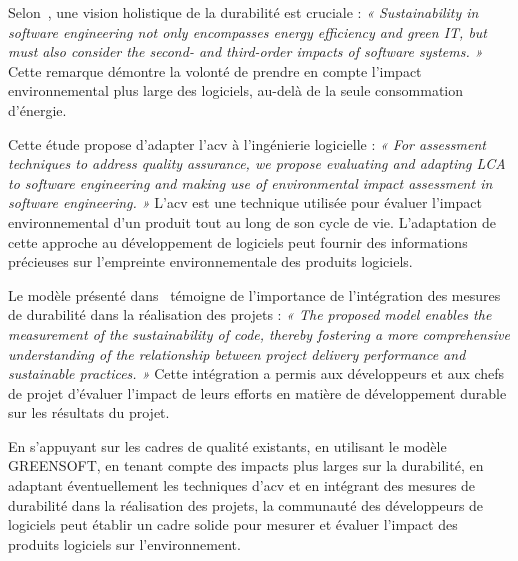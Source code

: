 Selon~\cite{SafetySecuritySustainability}, une vision holistique de la durabilité est cruciale : \emph{« Sustainability in software engineering not only encompasses energy efficiency and green IT, but must also consider the second- and third-order impacts of software systems. »} 
Cette remarque démontre la volonté de prendre en compte l'impact environnemental plus large des logiciels, au-delà de la seule consommation d'énergie.


Cette étude propose d'adapter l'\acrfull{acv} à l'ingénierie logicielle : \emph{« For assessment techniques to address quality assurance, we propose evaluating and adapting LCA to software engineering and making use of environmental impact assessment in software engineering. »} 
L'\acrshort{acv} est une technique utilisée pour évaluer l'impact environnemental d'un produit tout au long de son cycle de vie. 
L'adaptation de cette approche au développement de logiciels peut fournir des informations précieuses sur l'empreinte environnementale des produits logiciels.


Le modèle présenté dans~\cite{IntegrationSustainabilityMetrics} témoigne de l'importance de l'intégration des mesures de durabilité dans la réalisation des projets : \emph{« The proposed model enables the measurement of the sustainability of code, thereby fostering a more comprehensive understanding of the relationship between project delivery performance and sustainable practices. »} 
Cette intégration a permis aux développeurs et aux chefs de projet d'évaluer l'impact de leurs efforts en matière de développement durable sur les résultats du projet.


En s'appuyant sur les cadres de qualité existants, en utilisant le modèle GREENSOFT, en tenant compte des impacts plus larges sur la durabilité, en adaptant éventuellement les techniques d'\acrshort{acv} et en intégrant des mesures de durabilité dans la réalisation des projets, la communauté des développeurs de logiciels peut établir un cadre solide pour mesurer et évaluer l'impact des produits logiciels sur l'environnement.

